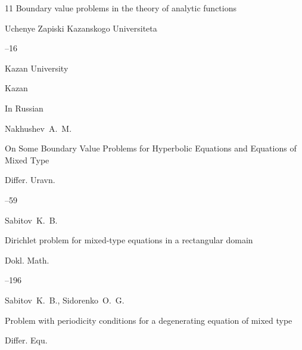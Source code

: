 \begin{thebibliography}{11}
\inbook Boundary value problems in the theory of analytic functions

\serial Uchenye Zapiski Kazanskogo Universiteta




--16

\publ Kazan University

\publaddr Kazan








\lang In Russian

\by Nakhushev~A.~M.

\paper On Some Boundary Value Problems for Hyperbolic Equations and Equations of Mixed Type

\jour Differ. Uravn.




--59






\by Sabitov~K.~B.

\paper Dirichlet problem for mixed-type equations in a rectangular domain

\jour Dokl. Math.



--196 










\by Sabitov~K.~B., Sidorenko~O.~G.

\paper Problem with periodicity conditions for a degenerating equation of mixed type

\jour Differ. Equ. 




\end{thebibliography}
